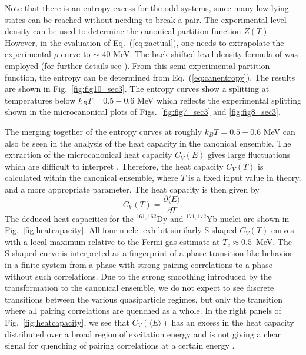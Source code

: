 \documentclass[preprint,rmp,aps,floatfix]{revtex4}
\begin{document}
Note that there is an entropy excess 
for the odd systems, since many low-lying
states can be reached without needing to break a pair.
The experimental level density can be used to determine the canonical 
partition function $Z(T)$. However, in the evaluation of 
Eq.\ (\ref{eq:zactual}), one needs  to extrapolate the 
experimental $\rho$ curve to $\sim$ 40 MeV. The 
back-shifted level density formula of \cite{back_shift,esb88} 
was employed (for further details see \cite{andreas2000}).
From this semi-experimental partition function, the 
entropy can be determined from Eq.\ (\ref{eq:canentropy}). The results 
are shown in Fig.\ \ref{fig:fig10_sec3}. The entropy curves show 
a splitting at temperatures below  $k_BT = 0.5 - 0.6$ MeV 
which reflects the experimental splitting shown in the microcanonical 
plots of Figs.~\ref{fig:fig7_sec3}  and \ref{fig:fig8_sec3}. 


The merging together of the entropy curves at roughly
$k_BT = 0.5 - 0.6$ MeV can also be seen in the analysis of the 
heat capacity in the canonical ensemble.  
The extraction of the microcanonical heat capacity $C_V(E)$ gives large 
fluctuations which are difficult to interpret \cite{oslo3}. Therefore, the heat 
capacity $C_V(T)$ is calculated within the canonical ensemble, where $T$ is a 
fixed input value in theory, and a more appropriate parameter. The heat 
capacity is then given by 
\begin{equation}
C_V(T)=\frac{\partial\langle E\rangle}{\partial T}.
\end{equation}
The deduced heat capacities for the $^{161,162}$Dy and $^{171,172}$Yb nuclei 
are shown in Fig.~\ref{fig:heatcapacity}. All four nuclei exhibit similarly 
S-shaped $C_V(T)$-curves with a local maximum relative to the Fermi gas 
estimate at $T_c\approx 0.5$~MeV. The S-shaped curve is interpreted as a 
fingerprint of a phase transition-like behavior in a 
finite system from a phase with strong 
pairing correlations to a phase without such correlations. Due to the strong 
smoothing introduced by the transformation to the canonical ensemble, we do not
expect to see discrete transitions between the various quasiparticle regimes, 
but only the transition where all pairing correlations are quenched as a whole.
In the right panels of Fig.~\ref{fig:heatcapacity}, we see that 
$C_V(\langle E\rangle)$ has an excess in the heat capacity distributed over 
a broad region of excitation energy and is not giving a clear signal for 
quenching of pairing correlations at a certain energy \cite{oslo3}. 
\end{document}
